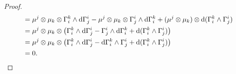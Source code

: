 \documentclass[11pt]{article}
\theoremstyle{definition}
\theoremstyle{plain}
\newtheorem{pro}[para]{Proposition}
\begin{document}
\begin{proof}
\begin{align*}
&=\mu^j\otimes \mu_k\otimes \Gamma^k_i\wedge \mathrm{d} \Gamma^i_j-
\mu^j\otimes \mu_k\otimes\Gamma^i_j\wedge\mathrm{d} \Gamma^k_i+
(\mu^j\otimes \mu_k)\otimes \mathrm{d}(\Gamma^k_i\wedge \Gamma^i_j)\\
&=\mu^j\otimes \mu_k\otimes \left(\Gamma^k_i\wedge \mathrm{d} \Gamma^i_j-\Gamma^i_j\wedge\mathrm{d} \Gamma^k_i+\mathrm{d}(\Gamma^k_i\wedge \Gamma^i_j)\right)\\
&=\mu^j\otimes \mu_k\otimes \left(\Gamma^k_i\wedge \mathrm{d} \Gamma^i_j-\mathrm{d} \Gamma^k_i\wedge\Gamma^i_j+\mathrm{d}(\Gamma^k_i\wedge \Gamma^i_j)\right)\\
&=0.\qedhere
\end{align*}
\end{proof}


\end{document}
